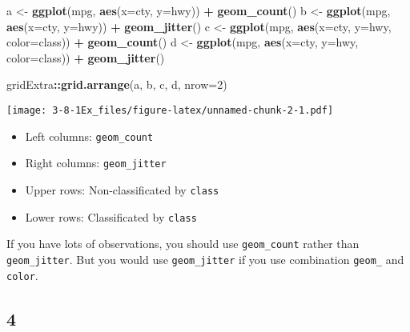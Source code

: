 \documentclass[]{article}
\newenvironment{Shaded}{\begin{snugshade}}{\end{snugshade}}
\newcommand{\DataTypeTok}[1]{\textcolor[rgb]{0.13,0.29,0.53}{#1}}
\newcommand{\DecValTok}[1]{\textcolor[rgb]{0.00,0.00,0.81}{#1}}
\newcommand{\KeywordTok}[1]{\textcolor[rgb]{0.13,0.29,0.53}{\textbf{#1}}}
\newcommand{\NormalTok}[1]{#1}
\newcommand{\OperatorTok}[1]{\textcolor[rgb]{0.81,0.36,0.00}{\textbf{#1}}}
\newcommand{\StringTok}[1]{\textcolor[rgb]{0.31,0.60,0.02}{#1}}
\providecommand{\tightlist}{%
  \setlength{\itemsep}{0pt}\setlength{\parskip}{0pt}}
\begin{document}
\begin{Shaded}
\begin{Highlighting}[]
\NormalTok{a <-}\StringTok{ }\KeywordTok{ggplot}\NormalTok{(mpg, }\KeywordTok{aes}\NormalTok{(}\DataTypeTok{x=}\NormalTok{cty, }\DataTypeTok{y=}\NormalTok{hwy)) }\OperatorTok{+}
\StringTok{    }\KeywordTok{geom_count}\NormalTok{()}
\NormalTok{b <-}\StringTok{ }\KeywordTok{ggplot}\NormalTok{(mpg, }\KeywordTok{aes}\NormalTok{(}\DataTypeTok{x=}\NormalTok{cty, }\DataTypeTok{y=}\NormalTok{hwy)) }\OperatorTok{+}
\StringTok{    }\KeywordTok{geom_jitter}\NormalTok{()}
\NormalTok{c <-}\StringTok{ }\KeywordTok{ggplot}\NormalTok{(mpg, }\KeywordTok{aes}\NormalTok{(}\DataTypeTok{x=}\NormalTok{cty, }\DataTypeTok{y=}\NormalTok{hwy, }\DataTypeTok{color=}\NormalTok{class)) }\OperatorTok{+}
\StringTok{    }\KeywordTok{geom_count}\NormalTok{()}
\NormalTok{d <-}\StringTok{ }\KeywordTok{ggplot}\NormalTok{(mpg, }\KeywordTok{aes}\NormalTok{(}\DataTypeTok{x=}\NormalTok{cty, }\DataTypeTok{y=}\NormalTok{hwy, }\DataTypeTok{color=}\NormalTok{class)) }\OperatorTok{+}
\StringTok{    }\KeywordTok{geom_jitter}\NormalTok{()}

\NormalTok{gridExtra}\OperatorTok{::}\KeywordTok{grid.arrange}\NormalTok{(a, b, c, d, }\DataTypeTok{nrow=}\DecValTok{2}\NormalTok{)}
\end{Highlighting}
\end{Shaded}

\texttt{[image: 3-8-1Ex\_files/figure-latex/unnamed-chunk-2-1.pdf]}

\begin{itemize}
\tightlist
\item
  Left columns: \texttt{geom\_count}\\
\item
  Right columns: \texttt{geom\_jitter}\\
\item
  Upper rows: Non-classificated by \texttt{class}\\
\item
  Lower rows: Classificated by \texttt{class}
\end{itemize}

If you have lots of observations, you should use \texttt{geom\_count}
rather than \texttt{geom\_jitter}. But you would use
\texttt{geom\_jitter} if you use combination \texttt{geom\_} and
\texttt{color}.

\hypertarget{section-4}{%
\subsection{4}\label{section-4}}
\end{document}
